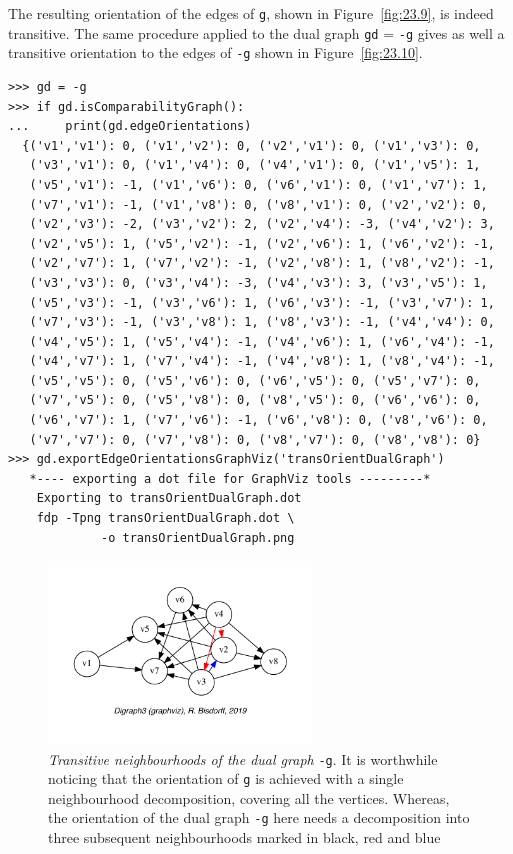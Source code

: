 The resulting orientation of the edges of \texttt{g}, shown in Figure~\vref{fig:23.9}, is indeed transitive. The same procedure applied to the dual graph \texttt{gd} = \texttt{-g} gives as well a transitive orientation to the edges of \texttt{-g} shown in Figure~\vref{fig:23.10}.
\begin{lstlisting}[basicstyle=\ttfamily\scriptsize]
>>> gd = -g
>>> if gd.isComparabilityGraph():
...     print(gd.edgeOrientations) 
  {('v1','v1'): 0, ('v1','v2'): 0, ('v2','v1'): 0, ('v1','v3'): 0,
   ('v3','v1'): 0, ('v1','v4'): 0, ('v4','v1'): 0, ('v1','v5'): 1,
   ('v5','v1'): -1, ('v1','v6'): 0, ('v6','v1'): 0, ('v1','v7'): 1,
   ('v7','v1'): -1, ('v1','v8'): 0, ('v8','v1'): 0, ('v2','v2'): 0,
   ('v2','v3'): -2, ('v3','v2'): 2, ('v2','v4'): -3, ('v4','v2'): 3,
   ('v2','v5'): 1, ('v5','v2'): -1, ('v2','v6'): 1, ('v6','v2'): -1,
   ('v2','v7'): 1, ('v7','v2'): -1, ('v2','v8'): 1, ('v8','v2'): -1,
   ('v3','v3'): 0, ('v3','v4'): -3, ('v4','v3'): 3, ('v3','v5'): 1,
   ('v5','v3'): -1, ('v3','v6'): 1, ('v6','v3'): -1, ('v3','v7'): 1,
   ('v7','v3'): -1, ('v3','v8'): 1, ('v8','v3'): -1, ('v4','v4'): 0,
   ('v4','v5'): 1, ('v5','v4'): -1, ('v4','v6'): 1, ('v6','v4'): -1,
   ('v4','v7'): 1, ('v7','v4'): -1, ('v4','v8'): 1, ('v8','v4'): -1,
   ('v5','v5'): 0, ('v5','v6'): 0, ('v6','v5'): 0, ('v5','v7'): 0,
   ('v7','v5'): 0, ('v5','v8'): 0, ('v8','v5'): 0, ('v6','v6'): 0,
   ('v6','v7'): 1, ('v7','v6'): -1, ('v6','v8'): 0, ('v8','v6'): 0,
   ('v7','v7'): 0, ('v7','v8'): 0, ('v8','v7'): 0, ('v8','v8'): 0}
>>> gd.exportEdgeOrientationsGraphViz('transOrientDualGraph')
   *---- exporting a dot file for GraphViz tools ---------*
    Exporting to transOrientDualGraph.dot
    fdp -Tpng transOrientDualGraph.dot \
             -o transOrientDualGraph.png
\end{lstlisting}
\begin{figure}[ht]
\sidecaption[t]
\includegraphics[width=7cm]{Figures/23-10-transOrientDualGraph.pdf}
\caption[Transitive neighbourhoods of the dual graph]{\emph{Transitive neighbourhoods of the dual graph} \texttt{-g}. It is worthwhile noticing that the orientation of \texttt{g} is achieved with a single neighbourhood decomposition, covering all the vertices. Whereas, the orientation of the dual graph \texttt{-g} here needs a decomposition into three subsequent neighbourhoods marked in black, red and blue} 
\label{fig:23.10}       %
\end{figure}
 
